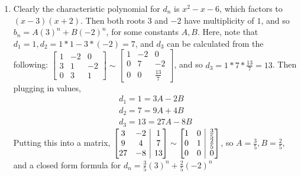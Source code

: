 \documentclass[10pt,english]{article}
\makeatletter
\newenvironment{amatrix}[1]{%
  \left[\begin{array}{@{}*{#1}{c}|c@{}}
}{%
  \end{array}\right]
}
\makeatother
\begin{document}
\begin{enumerate}
\pagebreak
\item Clearly the characteristic polynomial for $d_n$ is $x^2-x-6$, which factors to $(x-3)(x+2)$. Then both roots $3$ and $-2$ have multiplicity of $1$, and so $b_n=A(3)^n+B(-2)^n$, for some constants $A,B$. Here, note that $d_1=1, d_2=1*1-3*(-2)=7$, and $d_3$ can be calculated from the following: $\begin{bmatrix}1&-2&0\\3&1&-2\\0&3&1\end{bmatrix}\sim\begin{bmatrix}1&-2&0\\0&7&-2\\0&0&\frac{13}{7}\end{bmatrix}$, and so $d_3=1*7*\frac{13}{7}=13$. Then plugging in values, \begin{align*}d_1=1=3A-2B\\d_2=7=9A+4B\\d_3=13=27A-8B\end{align*} Putting this into a matrix, $\begin{amatrix}{2}3&-2&1\\9&4&7\\27&-8&13\end{amatrix}\sim\begin{amatrix}{2}1&0&\frac{3}{5}\\0&1&\frac{2}{5}\\0&0&0\end{amatrix}$, so $A=\frac{3}{5},B=\frac{2}{5}$, and a closed form formula for $d_n=\frac{3}{5}(3)^n+\frac{2}{5}(-2)^n$

\end{enumerate}
\end{document}
